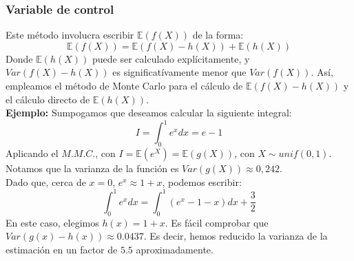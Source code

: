 \documentclass[a4paper]{article}
\numberwithin{equation}{subsection}
\numberwithin{definicion}{subsection}
\def\E{\mathbb E}
\begin{document}
\subsubsection{Variable de control}
Este método involucra escribir $\E(f(X))$ de la forma:
\[\E\left(f(X)\right) = \E\left(f(X)-h(X)\right) + \E\left(h(X)\right)\]
Donde $\E\left(h(X)\right)$ puede ser calculado explícitamente, y $Var\left(f(X)-h(X)\right)$ es significatívamente menor que $Var\left(f(X)\right)$. Así, empleamos el método de Monte Carlo para el cálculo de $\E\left(f(X)-h(X)\right)$ y el cálculo directo de $\E\left(h(X)\right)$.\\ \newline
\textbf{Ejemplo: }Sumpogamos que deseamos calcular la siguiente integral:
\[I = \int_{0}^1 e^x dx = e-1\]
Aplicando el $M.M.C.$, con $I=\E(e^X) = \E(g(X))$, con $X\sim unif(0,1)$. Notamos que la varianza de la función es $Var(g(X)) \approx 0,242$.\\
Dado que, cerca de $x=0$, $e^x \approx 1+x$, podemos escribir:
\[\int_{0}^1 e^x dx = \int_{0}^1 (e^x -1-x)dx + \frac{3}{2}\]
En este caso, elegimos $h(x)=1+x$. Es fácil comprobar que $Var\left(g(x)-h(x)\right) \approx 0.0437$. Es decir, hemos reducido la varianza de la estimación en un factor de $5.5$ aproximadamente.
\end{document}
